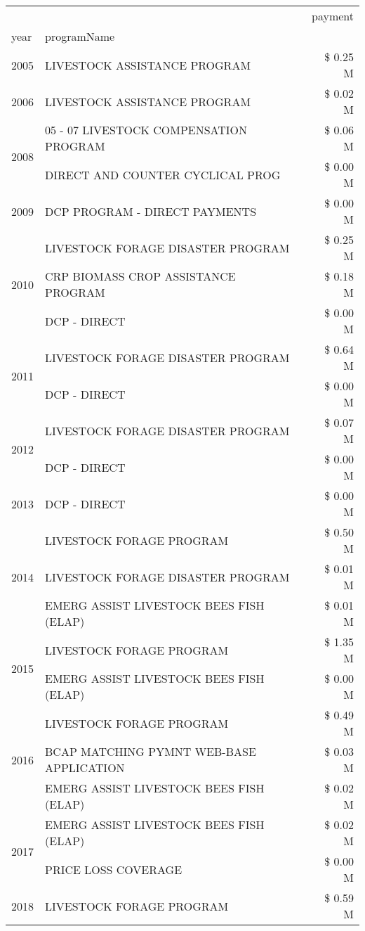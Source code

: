 \begin{tabular}{llr}
\toprule
 &  & payment \\
year & programName &  \\
\midrule
2005 & LIVESTOCK ASSISTANCE PROGRAM & \$ 0.25 M \\
\cline{1-3}
2006 & LIVESTOCK ASSISTANCE PROGRAM & \$ 0.02 M \\
\cline{1-3}
\multirow[t]{2}{*}{2008} & 05 - 07 LIVESTOCK COMPENSATION PROGRAM & \$ 0.06 M \\
 & DIRECT AND COUNTER CYCLICAL PROG & \$ 0.00 M \\
\cline{1-3}
2009 & DCP PROGRAM - DIRECT PAYMENTS & \$ 0.00 M \\
\cline{1-3}
\multirow[t]{3}{*}{2010} & LIVESTOCK FORAGE DISASTER PROGRAM & \$ 0.25 M \\
 & CRP BIOMASS CROP ASSISTANCE PROGRAM & \$ 0.18 M \\
 & DCP - DIRECT & \$ 0.00 M \\
\cline{1-3}
\multirow[t]{2}{*}{2011} & LIVESTOCK FORAGE DISASTER PROGRAM & \$ 0.64 M \\
 & DCP - DIRECT & \$ 0.00 M \\
\cline{1-3}
\multirow[t]{2}{*}{2012} & LIVESTOCK FORAGE DISASTER PROGRAM & \$ 0.07 M \\
 & DCP - DIRECT & \$ 0.00 M \\
\cline{1-3}
2013 & DCP - DIRECT & \$ 0.00 M \\
\cline{1-3}
\multirow[t]{3}{*}{2014} & LIVESTOCK FORAGE PROGRAM & \$ 0.50 M \\
 & LIVESTOCK FORAGE DISASTER PROGRAM & \$ 0.01 M \\
 & EMERG ASSIST LIVESTOCK BEES FISH (ELAP) & \$ 0.01 M \\
\cline{1-3}
\multirow[t]{2}{*}{2015} & LIVESTOCK FORAGE PROGRAM & \$ 1.35 M \\
 & EMERG ASSIST LIVESTOCK BEES FISH (ELAP) & \$ 0.00 M \\
\cline{1-3}
\multirow[t]{3}{*}{2016} & LIVESTOCK FORAGE PROGRAM & \$ 0.49 M \\
 & BCAP MATCHING PYMNT WEB-BASE APPLICATION & \$ 0.03 M \\
 & EMERG ASSIST LIVESTOCK BEES FISH (ELAP) & \$ 0.02 M \\
\cline{1-3}
\multirow[t]{2}{*}{2017} & EMERG ASSIST LIVESTOCK BEES FISH (ELAP) & \$ 0.02 M \\
 & PRICE LOSS COVERAGE & \$ 0.00 M \\
\cline{1-3}
\multirow[t]{3}{*}{2018} & LIVESTOCK FORAGE PROGRAM & \$ 0.59 M \\

\end{tabular}
